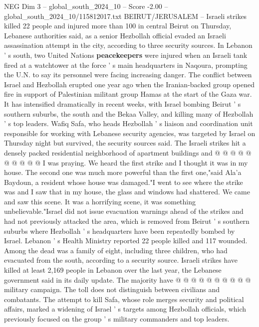 \begin{textsample}{NEG Dim 3 – global\_south\_2024\_10 – Score -2.00 – global\_south\_2024\_10/115812017.txt}  \label{ex:f3_neg_092}
BEIRUT/JERUSALEM -- Israeli strikes killed 22 people and injured more than 100 in central Beirut on Thursday, Lebanese authorities said, as a senior Hezbollah official evaded an Israeli assassination attempt in the city, according to three security sources.
In Lebanon ' s south, two United Nations \textbf{peacekeepers} were injured when an Israeli tank fired at a watchtower at the force ' s main headquarters in Naqoura, prompting the U.N. to say its personnel were facing increasing danger.
The conflict between Israel and Hezbollah erupted one year ago when the Iranian-backed group opened fire in support of Palestinian militant group Hamas at the start of the Gaza war.
It has intensified dramatically in recent weeks, with Israel bombing Beirut ' s southern suburbs, the south and the Bekaa Valley, and killing many of Hezbollah ' s top leaders.
Wafiq Safa, who heads Hezbollah ' s liaison and coordination unit responsible for working with Lebanese security agencies, was targeted by Israel on Thursday night but survived, the security sources said.
The Israeli strikes hit a densely packed residential neighborhood of apartment buildings and @ @ @ @ @ @ @ @ @ @ I was praying.
We heard the first strike and I thought it was in my house.
The second one was much more powerful than the first one,"said Ala'a Baydoun, a resident whose house was damaged."I went to see where the strike was and I saw that in my house, the glass and windows had shattered.
We came and saw this scene.
It was a horrifying scene, it was something unbelievable."Israel did not issue evacuation warnings ahead of the strikes and had not previously attacked the area, which is removed from Beirut ' s southern suburbs where Hezbollah ' s headquarters have been repeatedly bombed by Israel.
Lebanon ' s Health Ministry reported 22 people killed and 117 wounded.
Among the dead was a family of eight, including three children, who had evacuated from the south, according to a security source.
Israeli strikes have killed at least 2,169 people in Lebanon over the last year, the Lebanese government said in its daily update.
The majority have @ @ @ @ @ @ @ @ @ @ military campaign.
The toll does not distinguish between civilians and combatants.
The attempt to kill Safa, whose role merges security and political affairs, marked a widening of Israel ' s targets among Hezbollah officials, which previously focused on the group ' s military commanders and top leaders.

\end{textsample}

